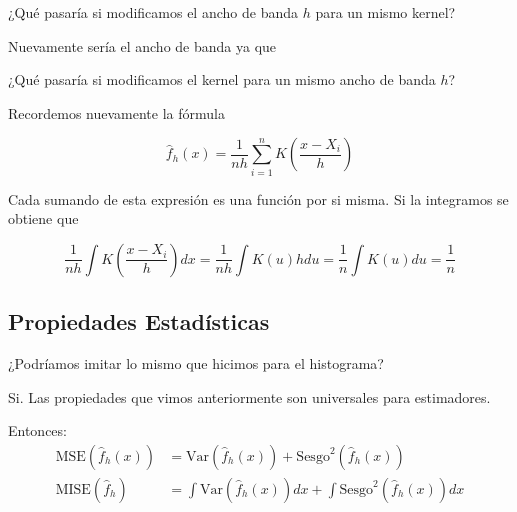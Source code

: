 \documentclass[12pt]{book}\usepackage[]{graphicx}\usepackage[]{color}
\theoremstyle{definition}
\theoremstyle{plain}
\begin{document}
\newpage

\begin{pregunta}{}{}
	¿Qué pasaría si modificamos el ancho de banda \(h\) para un mismo kernel?
\end{pregunta}

Nuevamente sería el ancho de banda ya que



\newpage

\begin{pregunta}{}{}
	¿Qué pasaría si modificamos el kernel para un mismo ancho de banda \(h\)?
\end{pregunta}



\newpage

Recordemos nuevamente la fórmula

\begin{equation*}
	\hat{f}_{h}\left( x \right) = \frac{1}{nh}\sum_{i=1}^{n} K\left( \frac{x-X_{i}}{h} \right)
\end{equation*}

Cada sumando de esta expresión es una función por si misma. Si la integramos se obtiene que

\begin{equation*}
	\frac{1}{nh}\int K\left( \frac{x-X_{i}}{h} \right) dx
	= \frac{1}{nh} \int K\left( u \right) h du
	= \frac{1}{n} \int K(u) du
	= \frac{1}{n}
\end{equation*}



\newpage

\subsection{Propiedades Estadísticas}

\begin{pregunta}{}{}
	¿Podríamos imitar lo mismo que hicimos para el histograma?
\end{pregunta}

Si. Las propiedades que vimos anteriormente son universales para estimadores.

Entonces:
\begin{align*}
	\mathrm{MSE}(\hat{f}_{h}(x)) & =\mathrm{Var}(\hat{f}_{h}(x))+\mathrm{Sesgo}^{2} (\hat{f}_{h}(x))            \\
	\mathrm{MISE}(\hat{f}_{h})   & =\int\mathrm{Var}(\hat{f}_{h}(x))dx+\int\mathrm{Sesgo}^{2}(\hat{f}_{h}(x))dx
\end{align*}
\end{document}

